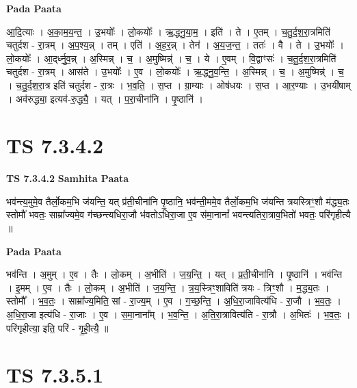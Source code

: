 \documentclass[17pt]{extarticle}
\begin{document}
\textbf{Pada Paata} \newline

आ॒दि॒त्याः । अ॒का॒म॒य॒न्त॒ । उ॒भयोः᳚ । लो॒कयोः᳚ । ऋ॒द्ध्नु॒या॒म॒ । इति॑ । ते । ए॒तम् । च॒तु॒र्द॒श॒रा॒त्रमिति॑ चतुर्दश - रा॒त्रम् । अ॒प॒श्य॒न्न् । तम् । एति॑ । अ॒ह॒र॒न्न् । तेन॑ । अ॒य॒ज॒न्त॒ । ततः॑ । वै । ते । उ॒भयोः᳚ । लो॒कयोः᳚ । आ॒द्‌र्ध्नु॒व॒न्न् । अ॒स्मिन्न् । च॒ । अ॒मुष्मिन्न्॑ । च॒ । ये । ए॒वम् । वि॒द्वाꣳसः॑ । च॒तु॒र्द॒श॒रा॒त्रमिति॑ चतुर्दश - रा॒त्रम् । आस॑ते । उ॒भयोः᳚ । ए॒व । लो॒कयोः᳚ । ऋ॒द्ध्नु॒व॒न्ति॒ । अ॒स्मिन्न् । च॒ । अ॒मुष्मिन्न्॑ । च॒ । च॒तु॒र्द॒श॒रा॒त्र इति॑ चतुर्दश - रा॒त्रः । भ॒व॒ति॒ । स॒प्त । ग्रा॒म्याः । ओष॑धयः । स॒प्त । आ॒र॒ण्याः । उ॒भयी॑षाम् । अव॑रुद्ध्या॒ इत्यव॑-रु॒द्ध्यै॒ । यत् । प॒रा॒चीना॑नि । पृ॒ष्ठानि॑ ।  \newline




\section*{ TS 7.3.4.2 }

\textbf{TS 7.3.4.2 } \newline
\textbf{Samhita Paata} \newline

भव॑न्त्य॒मुमे॒व तैर्लो॒कम॒भि ज॑यन्ति॒ यत् प्र॑ती॒चीना॑नि पृ॒ष्ठानि॒ भव॑न्ती॒ममे॒व तैर्लो॒कम॒भि ज॑यन्ति त्रयस्त्रिꣳ॒॒शौ म॑द्ध्य॒तः स्तोमौ॑ भवतः॒ साम्रा᳚ज्यमे॒व ग॑च्छन्त्यधिरा॒जौ भ॑वतोऽधिरा॒जा ए॒व स॑मा॒नानां᳚ भवन्त्यतिरा॒त्राव॒भितो॑ भवतः॒ परि॑गृहीत्यै ॥ \newline

\textbf{Pada Paata} \newline

भव॑न्ति । अ॒मुम् । ए॒व । तैः । लो॒कम् । अ॒भीति॑ । ज॒य॒न्ति॒ । यत् । प्र॒ती॒चीना॑नि । पृ॒ष्ठानि॑ । भव॑न्ति । इ॒मम् । ए॒व । तैः । लो॒कम् । अ॒भीति॑ । ज॒य॒न्ति॒ । त्र॒य॒स्त्रिꣳ॒॒शाविति॑ त्रयः - त्रिꣳ॒॒शौ । म॒द्ध्य॒तः । स्तोमौ᳚ । भ॒व॒तः॒ । साम्रा᳚ज्य॒मिति॒ सां - रा॒ज्य॒म् । ए॒व । ग॒च्छ॒न्ति॒ । अ॒धि॒रा॒जावित्य॑धि - रा॒जौ । भ॒व॒तः॒ । अ॒धि॒रा॒जा इत्य॑धि - रा॒जाः । ए॒व । स॒मा॒नाना᳚म् । भ॒व॒न्ति॒ । अ॒ति॒रा॒त्रावित्य॑ति - रा॒त्रौ । अ॒भितः॑ । भ॒व॒तः॒ । परि॑गृहीत्या॒ इति॒ परि॑ - गृ॒ही॒त्यै॒ ॥  \newline




\section*{ TS 7.3.5.1 }
\end{document}
